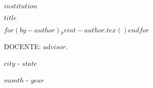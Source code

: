 \thispagestyle{empty}

\begin{center}
$institution$
\end{center}


\vspace{3.5cm}

\begin{center}
    \textbf{$title$}
\end{center}

\vspace{3.5cm}
\hypersetup{
    urlcolor=black,
    linkcolor=black
}

\begin{center}
$for(by-author)$$_print-author.tex()$$endfor$
\end{center}


\vspace{3.5cm}

\begin{center}

DOCENTE: $advisor$.
\end{center}

\vspace{3.5cm}

\begin{center}

$city$ - $state$

$month$ - $year$
    
\end{center}

\newpage

\renewcommand{\listfigurename}{LISTA DE FIGURAS}
\pagestyle{fancy}
\listoffigures

\newpage
\renewcommand{\listtablename}{LISTA DE TABELAS}
\pagestyle{fancy}
\listoftables

\newpage
\renewcommand{\contentsname}{SUMÁRIO}
\pagestyle{fancy}
\tableofcontents

\newpage
{}
